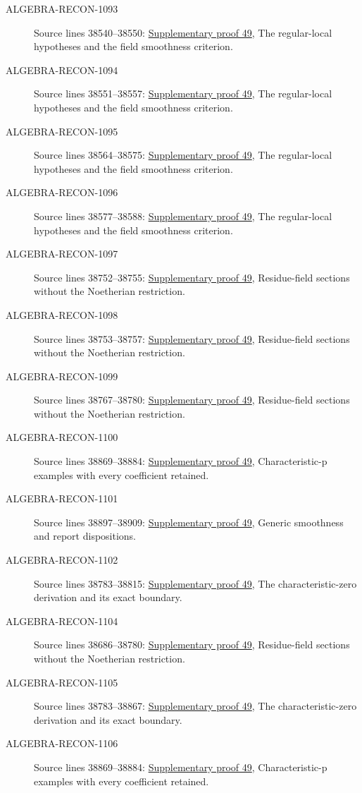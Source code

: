 \begin{description}
\item[ALGEBRA-RECON-1093] Source lines 38540--38550: \hyperlink{algebra_smooth_fields_notes_20260928}{Supplementary proof 49}, The regular-local hypotheses and the field smoothness criterion.
\item[ALGEBRA-RECON-1094] Source lines 38551--38557: \hyperlink{algebra_smooth_fields_notes_20260928}{Supplementary proof 49}, The regular-local hypotheses and the field smoothness criterion.
\item[ALGEBRA-RECON-1095] Source lines 38564--38575: \hyperlink{algebra_smooth_fields_notes_20260928}{Supplementary proof 49}, The regular-local hypotheses and the field smoothness criterion.
\item[ALGEBRA-RECON-1096] Source lines 38577--38588: \hyperlink{algebra_smooth_fields_notes_20260928}{Supplementary proof 49}, The regular-local hypotheses and the field smoothness criterion.
\item[ALGEBRA-RECON-1097] Source lines 38752--38755: \hyperlink{algebra_smooth_fields_notes_20260928}{Supplementary proof 49}, Residue-field sections without the Noetherian restriction.
\item[ALGEBRA-RECON-1098] Source lines 38753--38757: \hyperlink{algebra_smooth_fields_notes_20260928}{Supplementary proof 49}, Residue-field sections without the Noetherian restriction.
\item[ALGEBRA-RECON-1099] Source lines 38767--38780: \hyperlink{algebra_smooth_fields_notes_20260928}{Supplementary proof 49}, Residue-field sections without the Noetherian restriction.
\item[ALGEBRA-RECON-1100] Source lines 38869--38884: \hyperlink{algebra_smooth_fields_notes_20260928}{Supplementary proof 49}, Characteristic-p examples with every coefficient retained.
\item[ALGEBRA-RECON-1101] Source lines 38897--38909: \hyperlink{algebra_smooth_fields_notes_20260928}{Supplementary proof 49}, Generic smoothness and report dispositions.
\item[ALGEBRA-RECON-1102] Source lines 38783--38815: \hyperlink{algebra_smooth_fields_notes_20260928}{Supplementary proof 49}, The characteristic-zero derivation and its exact boundary.
\item[ALGEBRA-RECON-1104] Source lines 38686--38780: \hyperlink{algebra_smooth_fields_notes_20260928}{Supplementary proof 49}, Residue-field sections without the Noetherian restriction.
\item[ALGEBRA-RECON-1105] Source lines 38783--38867: \hyperlink{algebra_smooth_fields_notes_20260928}{Supplementary proof 49}, The characteristic-zero derivation and its exact boundary.
\item[ALGEBRA-RECON-1106] Source lines 38869--38884: \hyperlink{algebra_smooth_fields_notes_20260928}{Supplementary proof 49}, Characteristic-p examples with every coefficient retained.
\end{description}

